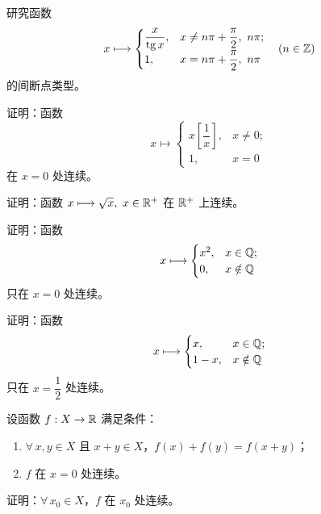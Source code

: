\begin{exercise}
	\item 研究函数
	\[
	x\longmapsto\begin{cases} \dfrac{x}{\operatorname{tg}x}, & x\neq n\pi+\dfrac\pi2,\ n\pi; \\ 1, & x=n\pi+\dfrac\pi2,\ n\pi \end{cases}\quad(n\in\mathbb{Z})
	\]
	的间断点类型。
\end{exercise}

\begin{exercise}
	\item 证明：函数
	\[
	x\longmapsto\begin{cases} x\left[\dfrac1x\right], & x\neq0; \\ 1, & x=0 \end{cases}
	\]
	在 \(x=0\) 处连续。
\end{exercise}

\begin{exercise}
	\item 证明：函数 \(x\longmapsto\sqrt{x},\ x\in\R^+\) 在 \(\mathbb{R}^+\) 上连续。
\end{exercise}

\begin{exercise}
	\item 证明：函数
	\[
	x\longmapsto\begin{cases} x^2, & x\in\mathbb{Q}; \\ 0, & x\notin\mathbb{Q} \end{cases}
	\]
	只在 \(x=0\) 处连续。
\end{exercise}

\begin{exercise}
	\item 证明：函数
	\[
	x\longmapsto\begin{cases} x, & x\in\mathbb{Q}; \\ 1-x, & x\notin\mathbb{Q} \end{cases}
	\]
	只在 \(x=\dfrac12\) 处连续。
\end{exercise}

\begin{exercise}
	\item 设函数 \(f:X\to\mathbb{R}\) 满足条件：
	\begin{enumerate}[label=\arabic*)]
		\item \(\forall\,x,y\in X\) 且 \(x+y\in X\)，\(f(x)+f(y)=f(x+y)\)；
		\item \(f\) 在 \(x=0\) 处连续。
	\end{enumerate}
	证明：\(\forall\,x_0\in X\)，\(f\) 在 \(x_0\) 处连续。
\end{exercise}

